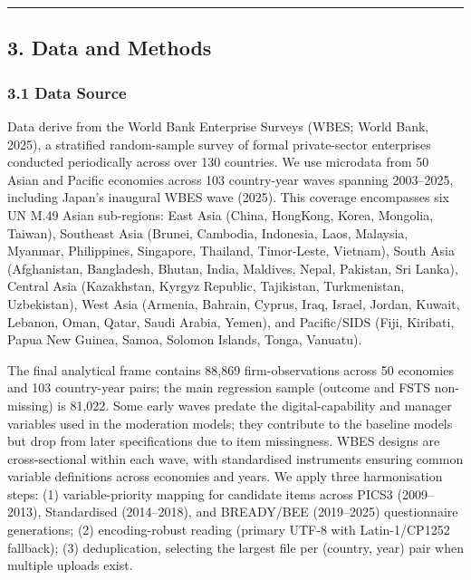 \documentclass[
  12pt,a4paper]{article}
\begin{document}
\begin{center}\rule{0.5\linewidth}{0.5pt}\end{center}

\hypertarget{data-and-methods}{%
\subsection{3. Data and Methods}\label{data-and-methods}}

\hypertarget{data-source}{%
\subsubsection{3.1 Data Source}\label{data-source}}

Data derive from the World Bank Enterprise Surveys (WBES; World Bank,
2025), a stratified random-sample survey of formal private-sector
enterprises conducted periodically across over 130 countries. We use
microdata from 50 Asian and Pacific economies across 103 country-year
waves spanning 2003--2025, including Japan's inaugural WBES wave (2025).
This coverage encompasses six UN M.49 Asian sub-regions: East Asia
(China, HongKong, Korea, Mongolia, Taiwan), Southeast Asia (Brunei,
Cambodia, Indonesia, Laos, Malaysia, Myanmar, Philippines, Singapore,
Thailand, Timor-Leste, Vietnam), South Asia (Afghanistan, Bangladesh,
Bhutan, India, Maldives, Nepal, Pakistan, Sri Lanka), Central Asia
(Kazakhstan, Kyrgyz Republic, Tajikistan, Turkmenistan, Uzbekistan),
West Asia (Armenia, Bahrain, Cyprus, Iraq, Israel, Jordan, Kuwait,
Lebanon, Oman, Qatar, Saudi Arabia, Yemen), and Pacific/SIDS (Fiji,
Kiribati, Papua New Guinea, Samoa, Solomon Islands, Tonga, Vanuatu).

The final analytical frame contains 88,869 firm-observations across 50
economies and 103 country-year pairs; the main regression sample
(outcome and FSTS non-missing) is 81,022. Some early waves predate the
digital-capability and manager variables used in the moderation models;
they contribute to the baseline models but drop from later
specifications due to item missingness. WBES designs are cross-sectional
within each wave, with standardised instruments ensuring common variable
definitions across economies and years. We apply three harmonisation
steps: (1) variable-priority mapping for candidate items across PICS3
(2009--2013), Standardised (2014--2018), and BREADY/BEE (2019--2025)
questionnaire generations; (2) encoding-robust reading (primary UTF-8
with Latin-1/CP1252 fallback); (3) deduplication, selecting the largest
file per (country, year) pair when multiple uploads exist.
\end{document}
